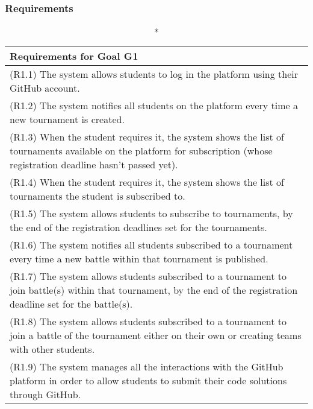 \subsubsection{Requirements}

\renewcommand{\arraystretch}{1.9}

\begin{longtable}{|p{16.5cm}|}
	\caption*{Requirements for Goal G1}
	\\
	\hline
(R1.1) The system allows students to log in the platform using their GitHub account. \\ 
\hline
(R1.2) The system notifies all students on the platform every time a new tournament is created.\\
\hline
(R1.3) When the student requires it, the system shows the list of tournaments available on the platform for subscription (whose registration deadline hasn't passed yet). \\
\hline
(R1.4) When the student requires it, the system shows the list of tournaments the student is subscribed to.\\
\hline
(R1.5) The system allows students to subscribe to tournaments, by the end of the registration deadlines set for the tournaments.  \\
\hline
(R1.6) The system notifies all students subscribed to a tournament every time a new battle within that tournament is published.  \\
\hline
(R1.7) The system allows students subscribed to a tournament to join battle(s) within that tournament, by the end of the registration deadline set for the battle(s). \\
\hline
(R1.8) The system allows students subscribed to a tournament to join a battle of the tournament either on their own or creating teams with other students.  \\
\hline
(R1.9) The system manages all the interactions with the GitHub platform in order to allow students to submit their code solutions through GitHub.
	

\end{longtable}
